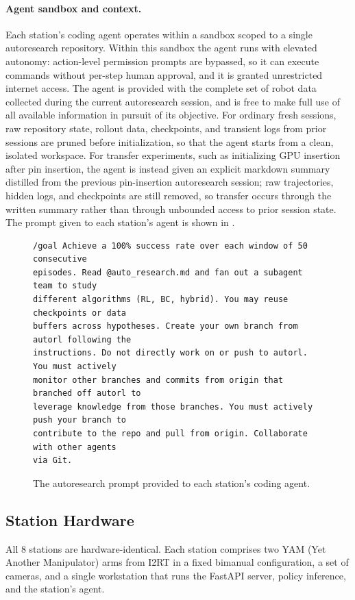 \paragraph{Agent sandbox and context.}
Each station's coding agent operates within a sandbox scoped to a single autoresearch repository. Within this sandbox the agent runs with elevated autonomy: action-level permission prompts are bypassed, so it can execute commands without per-step human approval, and it is granted unrestricted internet access. The agent is provided with the complete set of robot data collected during the current autoresearch session, and is free to make full use of all available information in pursuit of its objective. For ordinary fresh sessions, raw repository state, rollout data, checkpoints, and transient logs from prior sessions are pruned before initialization, so that the agent starts from a clean, isolated workspace. For transfer experiments, such as initializing GPU insertion after pin insertion, the agent is instead given an explicit markdown summary distilled from the previous pin-insertion autoresearch session; raw trajectories, hidden logs, and checkpoints are still removed, so transfer occurs through the written summary rather than through unbounded access to prior session state. The prompt given to each station's agent is shown in .

\begin{figure}[t]
\begin{verbatim}
/goal Achieve a 100% success rate over each window of 50 consecutive
episodes. Read @auto_research.md and fan out a subagent team to study
different algorithms (RL, BC, hybrid). You may reuse checkpoints or data
buffers across hypotheses. Create your own branch from autorl following the
instructions. Do not directly work on or push to autorl. You must actively
monitor other branches and commits from origin that branched off autorl to
leverage knowledge from those branches. You must actively push your branch to
contribute to the repo and pull from origin. Collaborate with other agents
via Git.
\end{verbatim}
\caption{The autoresearch prompt provided to each station's coding agent.}
\label{fig:autoresearch-prompt}
\end{figure}

\subsection{Station Hardware}
\label{app:station}
All 8 stations are hardware-identical. Each station comprises two YAM (Yet Another Manipulator) arms from I2RT in a fixed bimanual configuration, a set of cameras, and a single workstation that runs the FastAPI server, policy inference, and the station's agent.

